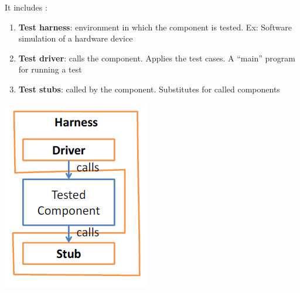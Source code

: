 \documentclass{article}
\begin{document}
\noindent It includes : 
\begin{multicols}{2}
\begin{enumerate}
    \item \textbf{Test
harness}:
environment
in
which
the
component
is
tested.
Ex:
Software
simulation
of
a
hardware
device
    \item \textbf{Test driver}: calls the component. Applies the test cases. A “main” program for running a test
\item \textbf{Test
stubs}:
called
by
the
component.
Substitutes
for
called
components
\end{enumerate}
\vfill\null\columnbreak
\begin{center}
    \includegraphics[scale=0.5]{image/45.PNG}
\end{center}
\end{multicols}
\end{document}
